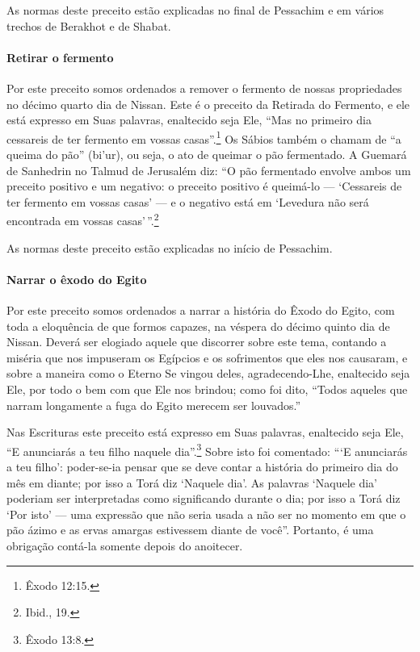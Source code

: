 As normas deste preceito estão explicadas no final de Pessachim e em
vários trechos de Berakhot e de Shabat.

\paragraph{Retirar o fermento}

Por este preceito somos ordenados a remover o fermento de nossas
propriedades no décimo quarto dia de Nissan. Este é o preceito da
Retirada do Fermento, e ele está expresso em Suas palavras, enaltecido seja Ele,
``Mas no primeiro dia cessareis de ter fermento em vossas casas''.\footnote{Êxodo 12:15.}
Os Sábios também o chamam de ``a queima do pão'' (bi'ur), ou seja, o ato
de queimar o pão fermentado. A Guemará de Sanhedrin no Talmud de
Jerusalém diz: ``O pão fermentado envolve ambos um preceito positivo e um negativo: o
preceito positivo é queimá-lo --- `Cessareis de ter fermento em vossas
casas' --- e o negativo está em `Levedura não será encontrada em vossas casas'\,''.\footnote{Ibid., 19.}

As normas deste preceito estão explicadas no início de Pessachim.

\paragraph{Narrar o êxodo do Egito}

Por este preceito somos ordenados a narrar a história do Êxodo do Egito,
com toda a eloquência de que formos capazes, na véspera do décimo quinto
dia de Nissan. Deverá ser elogiado aquele que discorrer sobre este tema,
contando a miséria que nos impuseram os Egípcios e os sofrimentos que
eles nos causaram, e sobre a maneira como o Eterno Se vingou deles,
agradecendo-Lhe, enaltecido seja Ele, por todo o bem com que Ele nos
brindou; como foi dito, ``Todos aqueles que narram longamente a fuga do
Egito merecem ser louvados.''

Nas Escrituras este preceito está expresso em Suas palavras, enaltecido
seja Ele, ``E anunciarás a teu filho naquele dia''.\footnote{Êxodo 13:8.} Sobre
isto foi comentado: ```E anunciarás a teu filho': poder-se-ia pensar que
se deve contar a história do primeiro dia do mês em diante; por isso a
Torá diz `Naquele dia'. As palavras `Naquele dia' poderiam ser
interpretadas como significando durante o dia; por isso a Torá diz
`Por isto' --- uma expressão que não seria usada a não ser no momento em
que o pão ázimo e as ervas amargas estivessem diante de você''.
Portanto, é uma obrigação contá-la somente depois do anoitecer.

